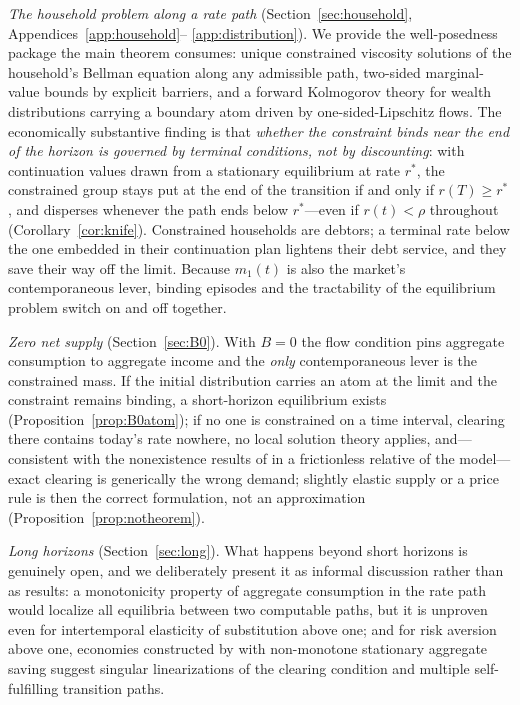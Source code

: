 \documentclass[11pt]{article}
\theoremstyle{definition}
\theoremstyle{remark}
\begin{document}
\emph{The household problem along a rate path}
(Section~\ref{sec:household}, Appendices~\ref{app:household}--%
\ref{app:distribution}). We provide the well-posedness package the
main theorem consumes: unique constrained viscosity solutions of the
household's Bellman equation along any admissible path, two-sided
marginal-value bounds by explicit barriers, and a forward Kolmogorov
theory for wealth distributions carrying a boundary atom driven by
one-sided-Lipschitz flows. The economically substantive finding is
that \emph{whether the constraint binds near the end of the horizon is
governed by terminal conditions, not by discounting}: with
continuation values drawn from a stationary equilibrium at rate
$r^*$, the constrained group stays put at the end of the transition if
and only if $r(T)\ge r^*$, and disperses whenever the path ends below
$r^*$---even if $r(t)<\rho$ throughout
(Corollary~\ref{cor:knife}). Constrained households are debtors; a
terminal rate below the one embedded in their continuation plan
lightens their debt service, and they save their way off the limit.
Because $m_1(t)$ is also the market's contemporaneous lever, binding
episodes and the tractability of the equilibrium problem switch on and
off together.

\emph{Zero net supply} (Section~\ref{sec:B0}). With $B=0$ the flow
condition pins aggregate consumption to aggregate income and the
\emph{only} contemporaneous lever is the constrained mass. If the
initial distribution carries an atom at the limit and the constraint
remains binding, a short-horizon equilibrium exists
(Proposition~\ref{prop:B0atom}); if no one is constrained on a time
interval, clearing there contains today's rate nowhere, no local
solution theory applies, and---consistent with the nonexistence
results of \citet{Ambrose2021} in a frictionless relative of the
model---exact clearing is generically the wrong demand; slightly
elastic supply or a price rule is then the correct formulation, not an
approximation (Proposition~\ref{prop:notheorem}).

\emph{Long horizons} (Section~\ref{sec:long}). What happens beyond
short horizons is genuinely open, and we deliberately present it as
informal discussion rather than as results: a monotonicity property of
aggregate consumption in the rate path would localize all equilibria
between two computable paths, but it is unproven even for
intertemporal elasticity of substitution above one; and for risk
aversion above one, economies constructed by \citet{Hofer2025} with
non-monotone stationary aggregate saving suggest singular
linearizations of the clearing condition and multiple self-fulfilling
transition paths.
\end{document}
